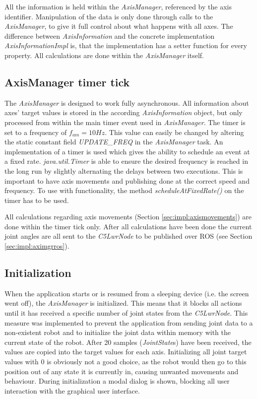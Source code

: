 All the information is held within the \textit{AxisManager}, referenced by the axis identifier. Manipulation of the data is only done through calls to the \textit{AxisManager}, to give it full control about what happens with all axes. The difference between \textit{AxisInformation} and the concrete implementation \textit{AxisInformationImpl} is, that the implementation has a setter function for every property. All calculations are done within the \textit{AxisManager} itself.

\subsection{AxisManager timer tick}

The \textit{AxisManager} is designed to work fully asynchronous. All information about axes' target values is stored in the according \textit{AxisInformation} object, but only processed from within the main timer event used in \textit{AxisManager}. The timer is set to a frequency of $f_{am} = 10Hz$. This value can easily be changed by altering the static constant field \textit{UPDATE\_FREQ} in the \textit{AxisManager} task. An implementation of a timer is used which gives the ability to schedule an event at a fixed rate. \textit{java.util.Timer} is able to ensure the desired frequency is reached in the long run by slightly alternating the delays between two executions\cite{AndroidTimer2018}. This is important to have axis movements and publishing done at the correct speed and frequency. To use with functionality, the method \textit{scheduleAtFixedRate()} on the timer has to be used. 

All calculations regarding axis movements (Section \ref{sec:impl:axismovements}) are done within the timer tick only. After all calculations have been done the current joint angles are all sent to the \textit{C5LwrNode} to be published over ROS (see Section \ref{sec:impl:aximgrros}).

\subsection{Initialization}

When the application starts or is resumed from a sleeping device (i.e. the screen went off), the \textit{AxisManager} is initialized. This means that it blocks all actions until it has received a specific number of joint states from the \textit{C5LwrNode}. This measure was implemented to prevent the application from sending joint data to a non-existent robot and to initialize the joint data within memory with the current state of the robot. After 20 samples (\textit{JointState}s) have been received, the values are copied into the target values for each axis.
Initializing all joint target values with 0 is obviously not a good choice, as the robot would then go to this position out of any state it is currently in, causing unwanted movements and behaviour. During initialization a modal dialog is shown, blocking all user interaction with the graphical user interface.

